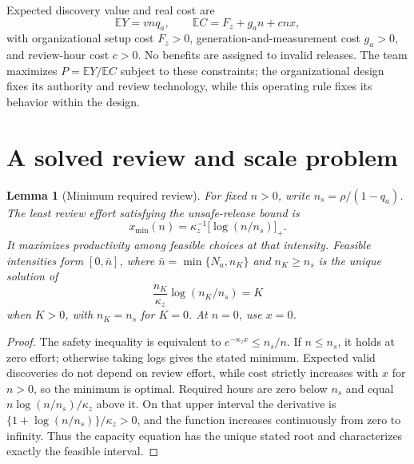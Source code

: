\documentclass[11pt,a4paper]{article}
\newtheorem{lemma}[theorem]{Lemma}
\theoremstyle{definition}
\theoremstyle{remark}
\newcommand{\E}{\mathbb E}
\begin{document}
Expected discovery value and real cost are
\[
 \E Y=vnq_a,\qquad \E C=F_z+g_an+c nx,
\]
with organizational setup cost $F_z>0$, generation-and-measurement cost $g_a>0$, and review-hour cost $c>0$. No benefits are assigned to invalid releases. The team maximizes $P=\E Y/\E C$ subject to these constraints; the organizational design fixes its authority and review technology, while this operating rule fixes its behavior within the design.

\section{A solved review and scale problem}
\begin{lemma}[Minimum required review]\label{le:review}
For fixed $n>0$, write $n_s=\rho/(1-q_a)$. The least review effort satisfying the unsafe-release bound is
\[
 x_{\min}(n)=\kappa_z^{-1}\bigl[\log(n/n_s)\bigr]_+.
\]
It maximizes productivity among feasible choices at that intensity. Feasible intensities form $[0,\bar n]$, where $\bar n=\min\{N_a,n_K\}$ and $n_K\geq n_s$ is the unique solution of
\[
 \frac{n_K}{\kappa_z}\log(n_K/n_s)=K
\]
when $K>0$, with $n_K=n_s$ for $K=0$. At $n=0$, use $x=0$.
\end{lemma}
\begin{proof}
The safety inequality is equivalent to
$e^{-\kappa_zx}\leq n_s/n$. If $n\leq n_s$, it holds at zero effort; otherwise taking logs gives the stated minimum. Expected valid discoveries do not depend on review effort, while cost strictly increases with $x$ for $n>0$, so the minimum is optimal. Required hours are zero below $n_s$ and equal $n\log(n/n_s)/\kappa_z$ above it. On that upper interval the derivative is $\{1+\log(n/n_s)\}/\kappa_z>0$, and the function increases continuously from zero to infinity. Thus the capacity equation has the unique stated root and characterizes exactly the feasible interval.
\end{proof}
\end{document}
